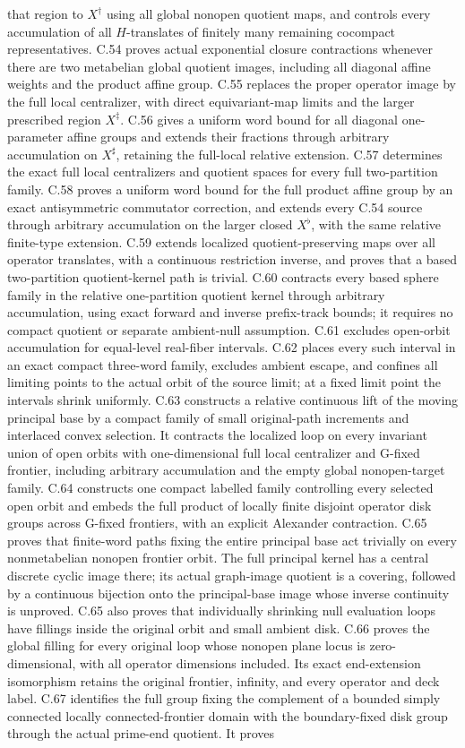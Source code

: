 that region to $X^\dagger$ using all global nonopen quotient
maps, and controls every accumulation of all $H$-translates
of finitely many remaining cocompact representatives.
C.54 proves actual exponential closure contractions whenever
there are two metabelian global quotient images, including
all diagonal affine weights and the product affine group.
C.55 replaces the proper operator image by the full local
centralizer, with direct equivariant-map limits and the
larger prescribed region $X^\ddagger$. C.56 gives a uniform
word bound for all diagonal one-parameter affine groups and
extends their fractions through arbitrary accumulation on
$X^\sharp$, retaining the full-local relative extension.
C.57 determines the exact full local centralizers and
quotient spaces for every full two-partition family.
C.58 proves a uniform word bound for the full product affine group by an exact antisymmetric commutator correction, and extends every C.54 source through arbitrary accumulation on the larger closed $X^\flat$, with the same relative finite-type extension. C.59 extends localized quotient-preserving maps over all operator translates, with a continuous restriction inverse, and proves that a based two-partition quotient-kernel path is trivial. C.60 contracts every based sphere family in the relative one-partition quotient kernel through arbitrary accumulation, using exact forward and inverse prefix-track bounds; it requires no compact quotient or separate ambient-null assumption. C.61 excludes open-orbit accumulation for equal-level real-fiber intervals. C.62 places every such interval in an exact compact three-word family, excludes ambient escape, and confines all limiting points to the actual orbit of the source limit; at a fixed limit point the intervals shrink uniformly. C.63 constructs a relative continuous lift of the moving principal base by a compact family of small original-path increments and interlaced convex selection. It contracts the localized loop on every invariant union of open orbits with one-dimensional full local centralizer and G-fixed frontier, including arbitrary accumulation and the empty global nonopen-target family. C.64 constructs one compact labelled family controlling every selected open orbit and embeds the full product of locally finite disjoint operator disk groups across G-fixed frontiers, with an explicit Alexander contraction. C.65 proves that finite-word paths fixing the entire principal base act trivially on every nonmetabelian nonopen frontier orbit. The full principal kernel has a central discrete cyclic image there; its actual graph-image quotient is a covering, followed by a continuous bijection onto the principal-base image whose inverse continuity is unproved. C.65 also proves that individually shrinking null evaluation loops have fillings inside the original orbit and small ambient disk. C.66 proves the global filling for every original loop whose nonopen plane locus is zero-dimensional, with all operator dimensions included. Its exact end-extension isomorphism retains the original frontier, infinity, and every operator and deck label. C.67 identifies the full group fixing the complement of a bounded simply connected locally connected-frontier domain with the boundary-fixed disk group through the actual prime-end quotient. It proves 